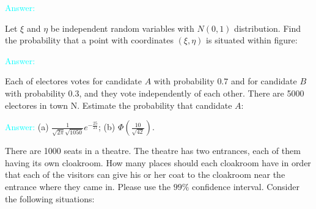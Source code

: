 \documentclass[14pt]{exam}
\begin{document}
\begin{questions}
		\textcolor{cyan}{Answer:}
		
		\question
		Let $\xi$ and $\eta$ be independent random variables with $N(0, 1)$ distribution. Find the probability that a point with coordinates $(\xi, \eta)$ is situated within figure:
		\textcolor{cyan}{Answer:}
		
		
		\question
		Each of electores votes for candidate $A$ with probability $0.7$ and for candidate $B$ with probability $0.3$, and they vote independently of each other. There are 5000 electores in town N. Estimate the probability that candidate $A$:
		\textcolor{cyan}{Answer:} (a) $\frac{1}{\sqrt{2\pi}\sqrt{1050}}e^{-\frac{25}{21}}$; (b) $\Phi(\frac{10}{\sqrt{42}})$.
		
		\question
		There are 1000 seats in a theatre. The theatre has two entrances, each of them having its own cloakroom.  How many places should each cloakroom have in order that each of the visitors can give his or her coat to the cloakroom near the entrance where they came in. Please use the $99\%$ confidence interval. Consider the following situations:
\end{questions}
\end{document}
